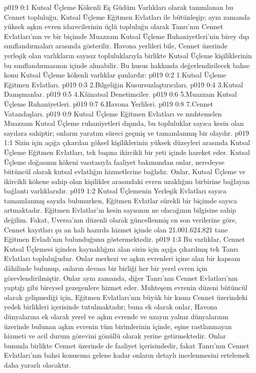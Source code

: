 \vs p019 0:1 Kutsal Üçleme Kökenli Eş Güdüm Varlıkları olarak tanımlanan bu Cennet topluluğu, Kutsal Üçleme Eğitmen Evlatları ile bütünleşip; aynı zamanda yüksek aşkın evren idarecilerinin üçlü topluluğu olarak Tanrı'nın Cennet Evlatları’nın ve bir biçimde Muazzam Kutsal Üçleme Ruhaniyetleri’nin birey dışı sınıflandırmaları arasında gösterilir. Havona yerlileri bile, Cennet üzerinde yerleşik olan varlıkların sayısız topluluklarıyla birlikte Kutsal Üçleme kişiliklerinin bu sınıflandırmasının içinde alınabilir. Bu husus hakkında değerlendirilecek bahse konu Kutsal Üçleme kökenli varlıklar şunlardır:
\vs p019 0:2 1.\bibnobreakspace Kutsal Üçleme Eğitmen Evlatları.
\vs p019 0:3 2.\bibnobreakspace Bilgeliğin Kusursuzlaştırıcıları.
\vs p019 0:4 3.\bibnobreakspace Kutsal Danışmanlar.
\vs p019 0:5 4.\bibnobreakspace Kâinatsal Denetimciler.
\vs p019 0:6 5.\bibnobreakspace Muazzam Kutsal Üçleme Ruhaniyetleri.
\vs p019 0:7 6.\bibnobreakspace Havona Yerlileri.
\vs p019 0:8 7.\bibnobreakspace Cennet Vatandaşları.
\vs p019 0:9 Kutsal Üçleme Eğitmen Evlatları ve muhtemelen Muazzam Kutsal Üçleme ruhaniyetleri dışında, bu topluluklar sayıca kesin olan sayılara sahiptir; onların yaratım süreci geçmiş ve tamamlanmış bir olaydır.
\vs p019 1:1 Sizin için açığa çıkarılan göksel kişiliklerinin yüksek düzeyleri arasında Kutsal Üçleme Eğitmen Evlatları, tek başına ikircikli bir yeti içinde hareket eder. Kutsal Üçleme doğasının kökeni vasıtasıyla faaliyet bakımından onlar, neredeyse bütüncül olarak kutsal evlatlığın hizmetlerine bağlıdır. Onlar, Kutsal Üçleme ve ikircikli kökene sahip olan kişilikler arasındaki evren uzaklığını birbirine bağlayan bağlantı varlıklarıdır.
\vs p019 1:2 Kutsal Üçlemenin Yerleşik Evlatları sayıca tamamlanmış sayıda bulunurken, Eğitmen Evlatlar sürekli bir biçimde sayıca artmaktadır. Eğitmen Evlatlar’ın kesin sayısının ne olacağının bilgisine sahip değilim. Fakat, Uversa’nın düzenli olarak güncellenmiş en son verilerine göre, Cennet kayıtları şu an hali hazırda hizmet içinde olan 21.001.624.821 tane Eğitmen Evladı’nın bulunduğunu göstermektedir.
\vs p019 1:3 Bu varlıklar, Cennet Kutsal Üçlemesi içinden kaynaklığını alan sizin için açığa çıkarılmış tek Tanrı Evlatları topluluğudur. Onlar merkezi ve aşkın evrenleri içine alan bir kapsam dâhilinde bulunup, onların devasa bir birliği her bir yerel evren için görevlendirilmiştir. Onlar aynı zamanda, diğer Tanrı'nın Cennet Evlatları’nın yaptığı gibi bireysel gezegenlere hizmet eder. Muhteşem evrenin düzeni bütüncül olarak gelişmediği için, Eğitmen Evlatları’nın büyük bir kısmı Cennet üzerindeki yedek birlikleri içerisinde tutulmaktadır; buna ek olarak onlar, Havona dünyalarına ek olarak yerel ve aşkın evrende ve uzayın yalnız dünyalarının üzerinde bulunan aşkın evrenin tüm birimlerinin içinde, eşine rastlanmayan hizmeti ve acil durum görevini gönüllü olarak yerine getirmektedir. Onlar bununla birlikte Cennet üzerinde de faaliyet içerisindedir, fakat Tanrı'nın Cennet Evlatları’nın bahsi konusuna gelene kadar onların detaylı incelenmesini ertelemek daha yararlı olacaktır.
